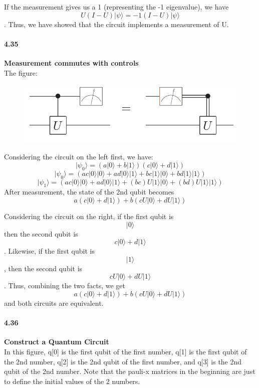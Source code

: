 If the measurement gives us a 1 (representing the -1 eigenvalue), we have $$U(I-U)|\psi\rangle = -1(I-U)|\psi\rangle$$. Thus, we have showed that the circuit implements a measurement of U.  

\paragraph{4.35} \textbf{Measurement commutes with controls}
\\

The figure:
\begin{figure}[h!]
    \centering
    \includegraphics[width = \linewidth]{Chapter 4/4.35.png}
    
    \label{fig:my_label}
\end{figure}

Considering the circuit on the left first, we have:
$$|\psi_0\rangle = (a|0\rangle + b|1\rangle)(c|0\rangle + d|1\rangle)$$
$$|\psi_0\rangle = (ac|0\rangle |0\rangle + ad|0\rangle |1\rangle + bc|1\rangle |0\rangle +bd|1\rangle |1\rangle)$$
$$|\psi_1\rangle = (ac|0\rangle |0\rangle + ad|0\rangle |1\rangle + (bc)U|1\rangle |0\rangle +(bd)U|1\rangle |1\rangle)$$
After measurement, the state of the 2nd qubit becomes 
$$a(c|0\rangle + d|1\rangle ) + b(cU|0\rangle + dU|1\rangle )$$


Considering the circuit on the right, if the first qubit is $$|0\rangle$$ then the second qubit is $$c|0\rangle + d|1\rangle $$. Likewise, if the first qubit is $$|1\rangle$$, then the second qubit is $$cU|0\rangle + dU|1\rangle $$. Thus, combining the two facts, we get $$a(c|0\rangle + d|1\rangle ) + b(cU|0\rangle + dU|1\rangle )$$ and both circuits are equivalent.


\paragraph{4.36} \textbf{Construct a Quantum Circuit}
\\

In this figure, q[0] is the first qubit of the first number, q[1] is the first qubit of the 2nd number, q[2] is the 2nd qubit of the first number, and q[3] is the 2nd qubit of the 2nd number. Note that the pauli-x matrices in the beginning are just to define the initial values of the 2 numbers. 

